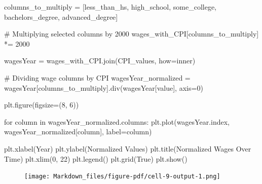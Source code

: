 \documentclass[
  letterpaper,
  DIV=11,
  numbers=noendperiod]{scrartcl}
\newenvironment{Shaded}{\begin{snugshade}}{\end{snugshade}}
\newcommand{\CommentTok}[1]{\textcolor[rgb]{0.37,0.37,0.37}{#1}}
\newcommand{\ControlFlowTok}[1]{\textcolor[rgb]{0.00,0.23,0.31}{#1}}
\newcommand{\DecValTok}[1]{\textcolor[rgb]{0.68,0.00,0.00}{#1}}
\newcommand{\KeywordTok}[1]{\textcolor[rgb]{0.00,0.23,0.31}{#1}}
\newcommand{\NormalTok}[1]{\textcolor[rgb]{0.00,0.23,0.31}{#1}}
\newcommand{\OperatorTok}[1]{\textcolor[rgb]{0.37,0.37,0.37}{#1}}
\newcommand{\StringTok}[1]{\textcolor[rgb]{0.13,0.47,0.30}{#1}}
\newcommand{\VariableTok}[1]{\textcolor[rgb]{0.07,0.07,0.07}{#1}}
\begin{document}
\begin{Shaded}
\begin{Highlighting}[]
\NormalTok{columns\_to\_multiply }\OperatorTok{=}\NormalTok{ [}\StringTok{\textquotesingle{}less\_than\_hs\textquotesingle{}}\NormalTok{, }\StringTok{\textquotesingle{}high\_school\textquotesingle{}}\NormalTok{, }\StringTok{\textquotesingle{}some\_college\textquotesingle{}}\NormalTok{, }\StringTok{\textquotesingle{}bachelors\_degree\textquotesingle{}}\NormalTok{, }\StringTok{\textquotesingle{}advanced\_degree\textquotesingle{}}\NormalTok{]}

\CommentTok{\# Multiplying selected columns by 2000}
\NormalTok{wages\_with\_CPI[columns\_to\_multiply] }\OperatorTok{*=} \DecValTok{2000}

\NormalTok{wagesYear }\OperatorTok{=}\NormalTok{ wages\_with\_CPI.join(CPI\_values, how}\OperatorTok{=}\StringTok{\textquotesingle{}inner\textquotesingle{}}\NormalTok{)}

\CommentTok{\# Dividing wage columns by \textquotesingle{}CPI\textquotesingle{}}
\NormalTok{wagesYear\_normalized }\OperatorTok{=}\NormalTok{ wagesYear[columns\_to\_multiply].div(wagesYear[}\StringTok{\textquotesingle{}value\textquotesingle{}}\NormalTok{], axis}\OperatorTok{=}\DecValTok{0}\NormalTok{)}

\NormalTok{plt.figure(figsize}\OperatorTok{=}\NormalTok{(}\DecValTok{8}\NormalTok{, }\DecValTok{6}\NormalTok{))}

\ControlFlowTok{for}\NormalTok{ column }\KeywordTok{in}\NormalTok{ wagesYear\_normalized.columns:}
\NormalTok{    plt.plot(wagesYear.index, wagesYear\_normalized[column], label}\OperatorTok{=}\NormalTok{column)}

\NormalTok{plt.xlabel(}\StringTok{\textquotesingle{}Year\textquotesingle{}}\NormalTok{)}
\NormalTok{plt.ylabel(}\StringTok{\textquotesingle{}Normalized Values\textquotesingle{}}\NormalTok{)}
\NormalTok{plt.title(}\StringTok{\textquotesingle{}Normalized Wages Over Time\textquotesingle{}}\NormalTok{)}
\NormalTok{plt.xlim(}\DecValTok{0}\NormalTok{, }\DecValTok{22}\NormalTok{)}
\NormalTok{plt.legend()}
\NormalTok{plt.grid(}\VariableTok{True}\NormalTok{)}
\NormalTok{plt.show()}
\end{Highlighting}
\end{Shaded}

\begin{figure}[H]

{\centering \texttt{[image: Markdown\_files/figure-pdf/cell-9-output-1.png]}

}

\end{figure}
\end{document}
